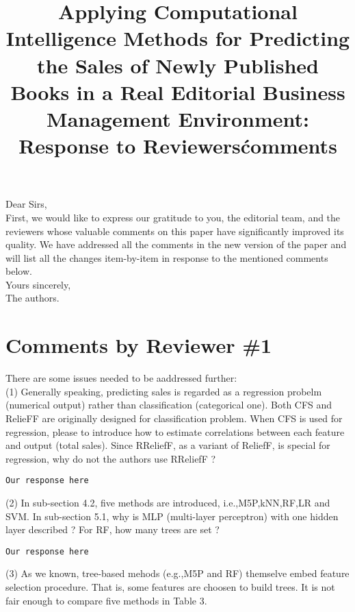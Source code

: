 \documentclass[preprint]{elsarticle}
\begin{document}

\title{Applying Computational Intelligence Methods for Predicting the Sales of Newly Published Books in a Real Editorial Business Management Environment: Response to Reviewers\' comments}

\noindent
Dear Sirs,\\

First, we would like to express our gratitude to you, the editorial team, and the reviewers whose valuable comments on this paper have significantly improved its quality. We have addressed all the comments in the new version of the paper and will list all the changes item-by-item in response to the mentioned comments below. \\

\noindent
Yours sincerely,\\
The authors.



\section{Comments by Reviewer \#1}


\noindent There are some issues needed to be aaddressed further: \\

\noindent (1) Generally speaking, predicting sales is regarded as a regression probelm (numerical output) rather than classification (categorical one). Both CFS and RelieFF are originally designed for classification problem. When CFS is used for regression, please to introduce how to estimate correlations between each feature and output (total sales). Since RReliefF, as a variant of ReliefF, is special for regression, why do not the authors use RReliefF ? \\

\begin{verbatim}
Our response here
\end{verbatim}

\noindent (2) In sub-section 4.2, five methods are introduced, i.e.,M5P,kNN,RF,LR and SVM. In sub-section 5.1, why is MLP (multi-layer perceptron) with one hidden layer described ? For RF, how many trees are set ?\\

\begin{verbatim}
Our response here
\end{verbatim}

\noindent (3) As we known, tree-based mehods (e.g.,M5P and RF) themselve embed feature selection procedure. That is, some features are choosen to build trees. It is not fair enough to compare five methods in Table 3. \\
\end{document}
